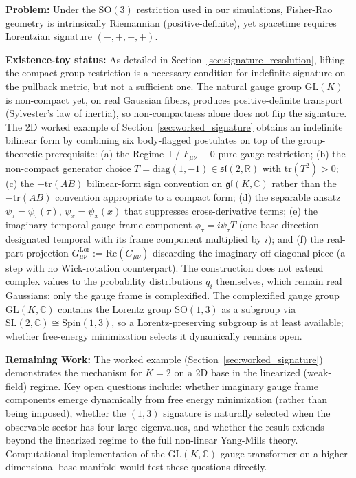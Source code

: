 \documentclass[11pt]{article}
\begin{document}
\textbf{Problem:} Under the $\mathrm{SO}(3)$ restriction used in our simulations, Fisher-Rao geometry is intrinsically Riemannian (positive-definite), yet spacetime requires Lorentzian signature $(-,+,+,+)$.

\textbf{Existence-toy status:} As detailed in Section~\ref{sec:signature_resolution}, lifting the compact-group restriction is a necessary condition for indefinite signature on the pullback metric, but not a sufficient one. The natural gauge group $\mathrm{GL}(K)$ is non-compact yet, on real Gaussian fibers, produces positive-definite transport (Sylvester's law of inertia), so non-compactness alone does not flip the signature. The 2D worked example of Section~\ref{sec:worked_signature} obtains an indefinite bilinear form by combining six body-flagged postulates on top of the group-theoretic prerequisite: (a) the Regime~I / $F_{\mu\nu} \equiv 0$ pure-gauge restriction; (b) the non-compact generator choice $T = \mathrm{diag}(1,-1) \in \mathfrak{sl}(2,\mathbb{R})$ with $\mathrm{tr}(T^2) > 0$; (c) the $+\mathrm{tr}(AB)$ bilinear-form sign convention on $\mathfrak{gl}(K,\mathbb{C})$ rather than the $-\mathrm{tr}(AB)$ convention appropriate to a compact form; (d) the separable ansatz $\psi_\tau = \psi_\tau(\tau)$, $\psi_x = \psi_x(x)$ that suppresses cross-derivative terms; (e) the imaginary temporal gauge-frame component $\phi_\tau = i\psi_\tau T$ (one base direction designated temporal with its frame component multiplied by $i$); and (f) the real-part projection $G^{\mathrm{Lor}}_{\mu\nu} := \mathrm{Re}(G_{\mu\nu})$ discarding the imaginary off-diagonal piece (a step with no Wick-rotation counterpart). The construction does not extend complex values to the probability distributions $q_i$ themselves, which remain real Gaussians; only the gauge frame is complexified. The complexified gauge group $\mathrm{GL}(K, \mathbb{C})$ contains the Lorentz group $\mathrm{SO}(1,3)$ as a subgroup via $\mathrm{SL}(2, \mathbb{C}) \cong \mathrm{Spin}(1,3)$, so a Lorentz-preserving subgroup is at least available; whether free-energy minimization selects it dynamically remains open.

\textbf{Remaining Work:} The worked example (Section~\ref{sec:worked_signature}) demonstrates the mechanism for $K=2$ on a 2D base in the linearized (weak-field) regime. Key open questions include: whether imaginary gauge frame components emerge dynamically from free energy minimization (rather than being imposed), whether the $(1,3)$ signature is naturally selected when the observable sector has four large eigenvalues, and whether the result extends beyond the linearized regime to the full non-linear Yang-Mills theory. Computational implementation of the $\mathrm{GL}(K, \mathbb{C})$ gauge transformer on a higher-dimensional base manifold would test these questions directly.
\end{document}
